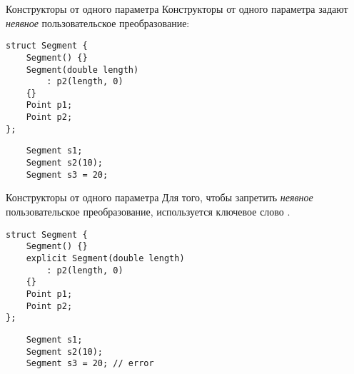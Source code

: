 \documentclass{beamer}
\begin{document}


\begin{frame}[fragile]{Конструкторы от одного параметра}
    Конструкторы от одного параметра задают {\em неявное}
    пользовательское преобразование:
\begin{lstlisting}
struct Segment {
    Segment() {}
    Segment(double length) 
        : p2(length, 0)
    {}
    Point p1;
    Point p2;
};
\end{lstlisting}
\begin{lstlisting}
    Segment s1;
    Segment s2(10);
    Segment s3 = 20;
\end{lstlisting}
\end{frame}

\begin{frame}[fragile]{Конструкторы от одного параметра}
    Для того, чтобы запретить {\em неявное} пользовательское
преобразование, используется ключевое слово .
\begin{lstlisting}
struct Segment {
    Segment() {}
    explicit Segment(double length) 
        : p2(length, 0)
    {}
    Point p1;
    Point p2;
};
\end{lstlisting}
\begin{lstlisting}
    Segment s1;
    Segment s2(10);
    Segment s3 = 20; // error
\end{lstlisting}
\end{frame}
\end{document}
